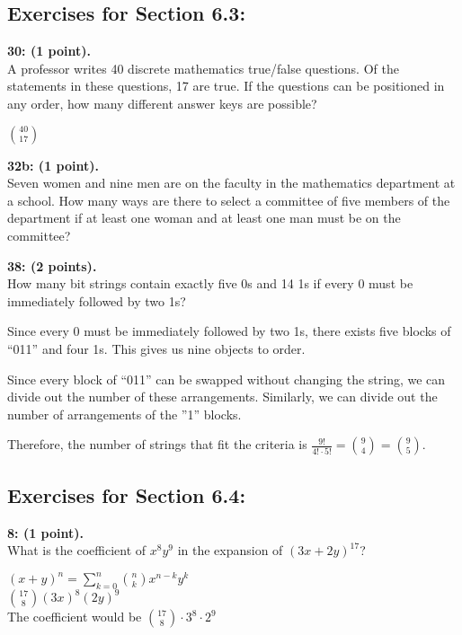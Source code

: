 \documentclass[12pt]{article}  %
\begin{document}
\clearpage
\subsection*{Exercises for Section 6.3:}     

\noindent
{\bf 30: (1 point).}\\
\noindent
A professor writes 40 discrete mathematics true/false questions. Of the statements in these questions, 17 are true. If the questions can be positioned in any order, how many different answer keys are possible?

\noindent
$\displaystyle\binom{40}{17}$

\noindent
{\bf 32b: (1 point).}\\
Seven women and nine men are on the faculty in the mathematics department at a school. How many ways are there to select a committee of five members of the department if at least one woman and at least one man must be on the committee?

\noindent
{\bf 38: (2 points).}\\
How many bit strings contain exactly five 0s and 14 1s if every 0 must be immediately followed by two 1s?

\noindent
Since every 0 must be immediately followed by two 1s, there exists five blocks of ``011'' and four 1s. This gives us nine objects to order.

\noindent
Since every block of ``011'' can be swapped without changing the string, we can divide out the number of these arrangements. Similarly, we can divide out the number of arrangements of the ''1'' blocks.

\noindent
Therefore, the number of strings that fit the criteria is $\displaystyle\frac{9!}{4!\cdot5!}=\binom{9}{4}=\binom{9}{5}$.

\clearpage
\subsection*{Exercises for Section 6.4:}     

\noindent
{\bf 8: (1 point).}\\
What is the coefficient of $x^8y^9$ in the expansion of $(3x+2y)^{17}$?

\noindent
$\displaystyle(x+y)^n=\sum_{k=0}^n\binom{n}{k}x^{n-k}y^k$\\
$\displaystyle\binom{17}{8}(3x)^8(2y)^9$\\
The coefficient would be $\displaystyle\binom{17}{8}\cdot3^8\cdot2^9$
\end{document}
